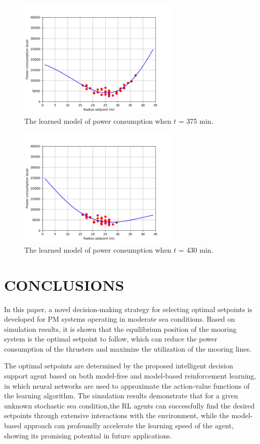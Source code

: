 \begin{sloppypar}
\begin{figure}[!htp]
	\centering
	\includegraphics[width=3in]{Images/reward_074.png}
	\caption{The learned model of power consumption when $t$ = 375 min.}
\end{figure}

\begin{figure}[!htp]
	\centering
	\includegraphics[width=3in]{Images/reward_085.png}
	\caption{The learned model of power consumption when $t$ = 430 min.}
	\label{fig: end}
\end{figure}


\section{CONCLUSIONS}
In this paper, a novel decision-making strategy for selecting optimal setpoints is developed for PM systems operating in moderate sea conditions. Based on simulation results, it is shown that the equilibrium position of the mooring system is the optimal setpoint to follow, which can reduce the power consumption of the thrusters and maximize the utilization of the mooring lines. 

The optimal setpoints are determined by the proposed intelligent decision support agent based on both model-free and model-based reinforcement learning, in which neural networks are used to approximate the action-value functions of the learning algorithm. The simulation results demonstrate that for a given unknown stochastic sea condition,the RL agents can successfully find the desired setpoints through extensive interactions with the environment, while the model-based approach can profoundly accelerate the learning speed of the agent, showing its promising potential in future applications.


\end{sloppypar}
